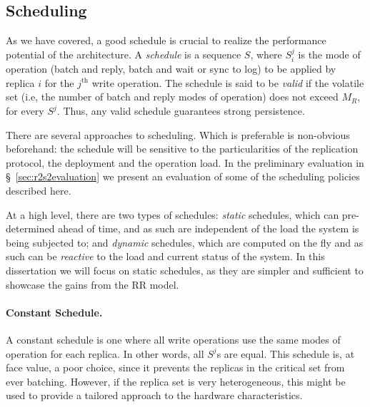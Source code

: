 \subsection{Scheduling}\label{ssec:schedule}

As we have covered, a good schedule is crucial to realize the
performance potential of the architecture. A \emph{schedule} is a
sequence $S$, where $S_i^j$ is the mode of operation (batch and
reply, batch and wait or sync to log) to be applied by replica
$i$ for the $j^\text{th}$ write operation. The
schedule is said to be \emph{valid} if the volatile set (i.e,
the number of batch and reply modes of operation) does not exceed
$M_R$, for every $S^j$. Thus, any valid schedule guarantees
strong persistence.

There are several approaches to scheduling. Which is preferable
is non-obvious beforehand: the schedule will be sensitive to the
particularities of the replication protocol, the deployment and
the operation load. In the preliminary evaluation in
\S~\ref{sec:r2s2evaluation} we present an
evaluation of some of the scheduling policies described
here.

At a high level, there are two types of schedules: \emph{static}
schedules, which can pre-determined ahead of time, and as such
are independent of the load the system is being subjected to; and
\emph{dynamic} schedules, which are computed on the fly and as
such can be \emph{reactive} to the load and current status of the
system. In this dissertation we will focus on static schedules,
as they are simpler and sufficient to showcase the gains from the
\ac{RR} model.

\paragraph{Constant Schedule.} A constant schedule is one where
all write operations use the same modes of operation for each
replica. In other words, all $S^j$s are equal. This schedule is,
at face value, a poor choice, since it prevents the replicas in the
critical set from ever batching. However, if the replica set is
very heterogeneous, this might be used to provide a tailored
approach to the hardware characteristics.

